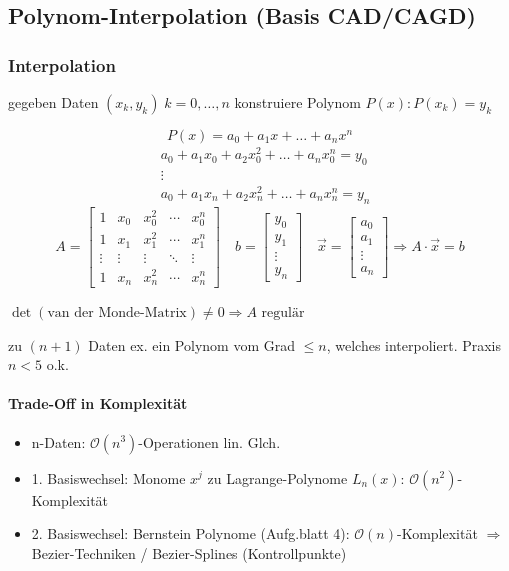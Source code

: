 
\subsection{Polynom-Interpolation (Basis CAD/CAGD)}

\label{interpolation}
\subsubsection{Interpolation}
gegeben Daten $(x_k, y_k)\;k=0,\ldots,n$
konstruiere Polynom $P(x): P(x_k) = y_k$

$$ P(x) = a_0 + a_1x + \ldots + a_nx^n $$\begin{align*}
&a_0 + a_1x_0 + a_2x_0^2 + \ldots + a_nx_0^n = y_0 \\
&\vdots \\
&a_0 + a_1x_n + a_2x_n^2 + \ldots + a_nx_n^n = y_n
\end{align*}
$$
A = 
\begin{bmatrix}
	1 & x_0 & x_0^2 & \cdots & x_0^n \\
	1 & x_1 & x_1^2 & \cdots & x_1^n \\
	\vdots & \vdots & \vdots & \ddots & \vdots \\
	1 & x_n & x_n^2 & \cdots & x_n^n
\end{bmatrix} \quad
b = \begin{bmatrix}	y_0 \\	y_1 \\	\vdots \\	y_n \end{bmatrix} \quad
\vec{x} = \begin{bmatrix}	a_0 \\	a_1 \\	\vdots \\	a_n \end{bmatrix}
\Rightarrow
A \cdot \vec{x} = b
$$

$\det(\text{van der Monde-Matrix}) \neq 0 \Rightarrow A\text{ regulär}$

\begin{proposition}
	zu $(n + 1)$ Daten ex. ein Polynom vom Grad $\le n$, welches interpoliert. Praxis $n < 5$ o.k.
\end{proposition}

\paragraph{Trade-Off in Komplexität}
\begin{itemize}
\item n-Daten: $\mathcal O (n^3)$-Operationen lin. Glch.
\item 1. Basiswechsel: Monome $x^j$ zu Lagrange-Polynome $L_n(x)$: $\mathcal O (n^2)$-Komplexität
\item 2. Basiswechsel: Bernstein Polynome (Aufg.blatt 4): $\mathcal O (n)$-Komplexität
  $\Rightarrow$ Bezier-Techniken / Bezier-Splines (Kontrollpunkte)
\end{itemize}


